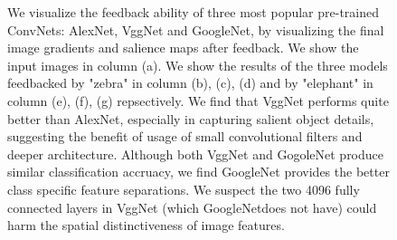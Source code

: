 \begin{figure}
\begin{center}
\caption{We visualize the feedback ability of three most popular pre-trained ConvNets: AlexNet, VggNet and GoogleNet, by visualizing the final image gradients and salience maps after feedback. We show the input images in column (a). We show the results of the three models feedbacked by "zebra" in column (b), (c), (d) and by "elephant" in column (e), (f), (g) repsectively. We find that VggNet performs quite better than AlexNet, especially in capturing salient object details, suggesting the benefit of usage of small convolutional filters and deeper architecture. Although both VggNet and GogoleNet produce similar classification accruacy, we find GoogleNet provides the better class specific feature separations. We suspect the two 4096 fully connected layers in VggNet (which GoogleNetdoes not have) could harm the spatial distinctiveness of image features.}
\label{fig:model_compare}
\end{center}
\end{figure}

